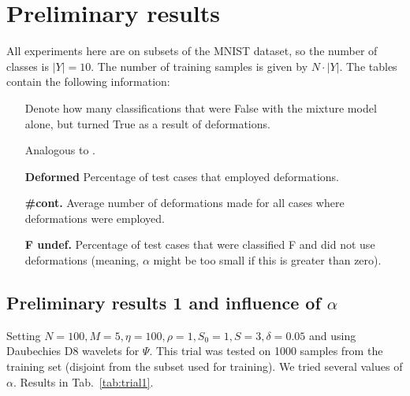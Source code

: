 \documentclass{report}
\begin{document}
\section{Preliminary results}
All experiments here are on subsets of the MNIST dataset, so the number of classes is $|Y| = 10$. The number of training samples is given by $N \cdot |Y|$. The tables contain the following information:
\begin{itemize}
    \item[\textbf{\FT}] Denote how many classifications that were False with the mixture model alone, but turned True as a result of deformations.
    \item[\textbf{\TF}] Analogous to \FT.
    \item[\textbf{Deformed}] Percentage of test cases that employed deformations. 
    \item[\textbf{\#cont.}] Average number of deformations made for all cases where deformations were employed.
    \item[\textbf{F undef.}] Percentage of test cases that were classified F and did not use deformations (meaning, $\alpha$ might be too small if this is greater than zero).
\end{itemize}

\subsection{Preliminary results 1 and influence of $\alpha$}
Setting $N=100, M=5, \eta=100, \rho=1, S_0=1, S=3, \delta=0.05$ and using Daubechies D8 wavelets for $\Psi$. This trial was tested on 1000 samples from the training set (disjoint from the subset used for training). We tried several values of $\alpha$. Results in Tab.~\ref{tab:trial1}.
\end{document}
